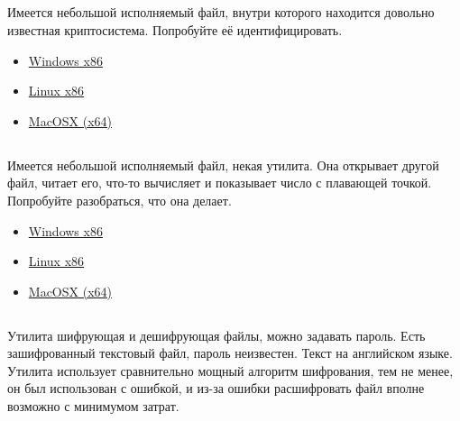 \subsection{}

Имеется небольшой исполняемый файл, внутри которого находится довольно известная криптосистема.
Попробуйте её идентифицировать.

\begin{itemize}
\item
\href{http://yurichev.com/RE-tasks/middle/2/unknown_cryptosystem.exe}{Windows x86}

\item
\href{http://yurichev.com/RE-tasks/middle/2/unknown_encryption_linux86.tar}{Linux x86}

\item
\href{http://yurichev.com/RE-tasks/middle/2/unknown_encryption_MacOSX.tar}{MacOSX (x64)}
\end{itemize}

\subsection{}

Имеется небольшой исполняемый файл, некая утилита.
Она открывает другой файл, читает его, что-то вычисляет и показывает число с плавающей точкой.
Попробуйте разобраться, что она делает.

\begin{itemize}
\item
\href{http://yurichev.com/RE-tasks/middle/3/unknown_utility_2_3.exe}{Windows x86}

\item
\href{http://yurichev.com/RE-tasks/middle/3/unknown_utility_2_3_Linux86.tar}{Linux x86}

\item
\href{http://yurichev.com/RE-tasks/middle/3/unknown_utility_2_3_MacOSX.tar}{MacOSX (x64)}
\end{itemize}

\subsection{}

Утилита шифрующая и дешифрующая файлы, можно задавать пароль. Есть зашифрованный текстовый файл, пароль неизвестен.
Текст на английском языке.
Утилита использует сравнительно мощный алгоритм шифрования, тем не менее, он был использован с ошибкой,
и из-за ошибки расшифровать файл вполне возможно с минимумом затрат.

